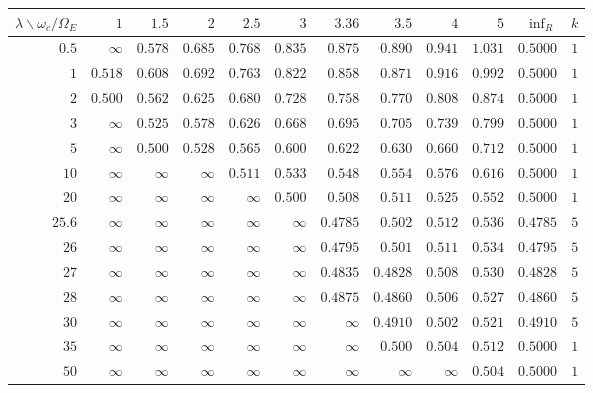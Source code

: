 \documentclass[11pt]{article}
\newcommand{\OmE}{\Omega_E}
\theoremstyle{definition}
\theoremstyle{remark}
\begin{document}
\begin{table}[t]
\centering
\scriptsize
\setlength{\tabcolsep}{2.6pt}
\renewcommand{\arraystretch}{1.1}
\begin{tabular}{@{}rrrrrrrrrrrr@{}}
\toprule
$\lambda\backslash\omega_c/\OmE$ & $1$ & $1.5$ & $2$ & $2.5$ & $3$ & $3.36$ & $3.5$ & $4$ & $5$ &
$\inf_R$ & $k$\\
\midrule
$0.5$ & $\infty$ & $0.578$ & $0.685$ & $0.768$ & $0.835$ & $0.875$ & $0.890$ & $0.941$ &
$1.031$ & $0.5000$ & $1$\\
$1$ & $0.518$ & $0.608$ & $0.692$ & $0.763$ & $0.822$ & $0.858$ & $0.871$ & $0.916$ &
$0.992$ & $0.5000$ & $1$\\
$2$ & $0.500$ & $0.562$ & $0.625$ & $0.680$ & $0.728$ & $0.758$ & $0.770$ & $0.808$ &
$0.874$ & $0.5000$ & $1$\\
$3$ & $\infty$ & $0.525$ & $0.578$ & $0.626$ & $0.668$ & $0.695$ & $0.705$ & $0.739$ &
$0.799$ & $0.5000$ & $1$\\
$5$ & $\infty$ & $0.500$ & $0.528$ & $0.565$ & $0.600$ & $0.622$ & $0.630$ & $0.660$ &
$0.712$ & $0.5000$ & $1$\\
$10$ & $\infty$ & $\infty$ & $\infty$ & $0.511$ & $0.533$ & $0.548$ & $0.554$ & $0.576$ &
$0.616$ & $0.5000$ & $1$\\
$20$ & $\infty$ & $\infty$ & $\infty$ & $\infty$ & $0.500$ & $0.508$ & $0.511$ & $0.525$ &
$0.552$ & $0.5000$ & $1$\\
$25.6$ & $\infty$ & $\infty$ & $\infty$ & $\infty$ & $\infty$ & $0.4785$ & $0.502$ &
$0.512$ & $0.536$ & $0.4785$ & $5$\\
$26$ & $\infty$ & $\infty$ & $\infty$ & $\infty$ & $\infty$ & $0.4795$ & $0.501$ &
$0.511$ & $0.534$ & $0.4795$ & $5$\\
$27$ & $\infty$ & $\infty$ & $\infty$ & $\infty$ & $\infty$ & $0.4835$ & $0.4828$ &
$0.508$ & $0.530$ & $0.4828$ & $5$\\
$28$ & $\infty$ & $\infty$ & $\infty$ & $\infty$ & $\infty$ & $0.4875$ & $0.4860$ &
$0.506$ & $0.527$ & $0.4860$ & $5$\\
$30$ & $\infty$ & $\infty$ & $\infty$ & $\infty$ & $\infty$ & $\infty$ & $0.4910$ &
$0.502$ & $0.521$ & $0.4910$ & $5$\\
$35$ & $\infty$ & $\infty$ & $\infty$ & $\infty$ & $\infty$ & $\infty$ & $0.500$ &
$0.504$ & $0.512$ & $0.5000$ & $1$\\
$50$ & $\infty$ & $\infty$ & $\infty$ & $\infty$ & $\infty$ & $\infty$ & $\infty$ &
$\infty$ & $0.504$ & $0.5000$ & $1$\\

\end{tabular}
\end{table}
\end{document}
